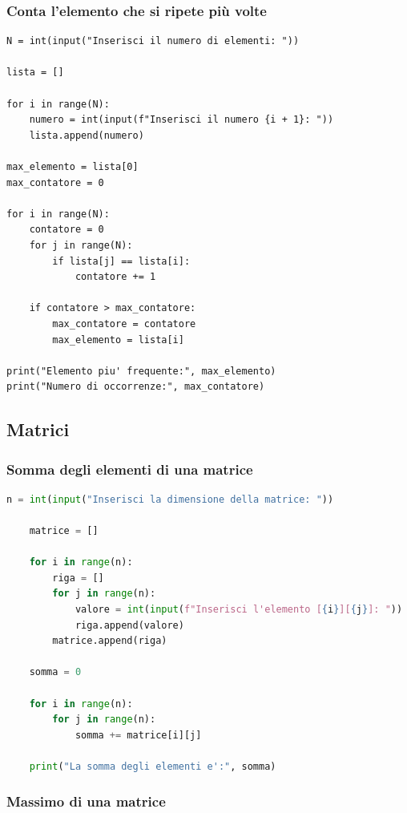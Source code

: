 \documentclass[a4paper,12pt]{article}
\begin{document}
\subsubsection{Conta l'elemento che si ripete più volte}
\begin{lstlisting}
N = int(input("Inserisci il numero di elementi: "))
	
lista = []
	
for i in range(N):
	numero = int(input(f"Inserisci il numero {i + 1}: "))
	lista.append(numero)
	
max_elemento = lista[0]
max_contatore = 0
	
for i in range(N):
	contatore = 0
	for j in range(N):
		if lista[j] == lista[i]:
			contatore += 1
	
	if contatore > max_contatore:
		max_contatore = contatore
		max_elemento = lista[i]
	
print("Elemento piu' frequente:", max_elemento)
print("Numero di occorrenze:", max_contatore)
\end{lstlisting}









\newpage
\subsection{Matrici}

\subsubsection{Somma degli elementi di una matrice}

\begin{lstlisting}[language=Python]
	n = int(input("Inserisci la dimensione della matrice: "))
	
	matrice = []
	
	for i in range(n):
		riga = []
		for j in range(n):
			valore = int(input(f"Inserisci l'elemento [{i}][{j}]: "))
			riga.append(valore)
		matrice.append(riga)
	
	somma = 0
	
	for i in range(n):
		for j in range(n):
			somma += matrice[i][j]
	
	print("La somma degli elementi e':", somma)
\end{lstlisting}

\newpage


\subsubsection{Massimo di una matrice}
\end{document}
